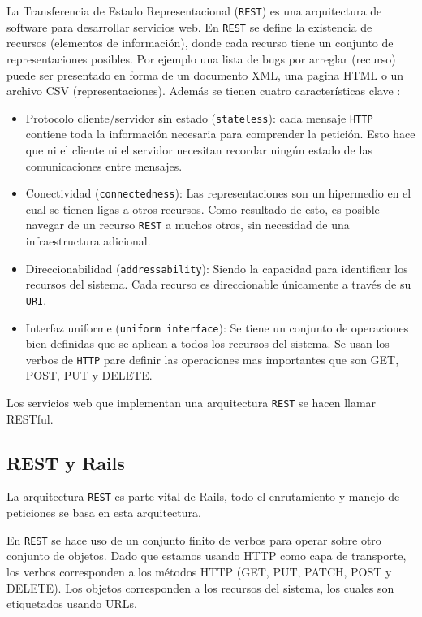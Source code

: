 La Transferencia de Estado Representacional (\texttt{REST}) es una arquitectura
de software para desarrollar servicios web. En \texttt{REST} se define la
existencia de recursos (elementos de información), donde cada recurso tiene un
conjunto de representaciones posibles. Por ejemplo una lista de bugs por arreglar
(recurso) puede ser presentado en forma de un documento XML, una pagina HTML
o un archivo CSV (representaciones). Además se tienen cuatro características
clave \cite[pag.~79]{1_richardson_2007}:

\begin{itemize}
\item Protocolo cliente/servidor sin estado (\texttt{stateless}): cada mensaje
  \texttt{HTTP} contiene toda la información necesaria para comprender la
  petición. Esto hace que ni el cliente ni el servidor necesitan recordar ningún
  estado de las comunicaciones entre mensajes.
\item Conectividad (\texttt{connectedness}): Las representaciones son un hipermedio
  en el cual se tienen ligas a otros recursos. Como resultado de esto, es posible
  navegar de un recurso \texttt{REST} a muchos otros, sin necesidad de una
  infraestructura adicional.
\item Direccionabilidad (\texttt{addressability}): Siendo la capacidad para
  identificar los recursos del sistema. Cada recurso es direccionable únicamente
  a través de su \texttt{URI}.
\item Interfaz uniforme (\texttt{uniform interface}): Se tiene un conjunto de
  operaciones bien definidas que se aplican a todos los recursos del sistema.
  Se usan los verbos de \texttt{HTTP} pare definir las operaciones mas importantes
  que son GET, POST, PUT y DELETE.
\end{itemize}

Los servicios web que implementan una arquitectura \texttt{REST} se hacen llamar
RESTful.

\subsection{REST y Rails}

La arquitectura \texttt{REST} es parte vital de Rails, todo el enrutamiento y
manejo de peticiones se basa en esta arquitectura.

En \texttt{REST} se hace uso de un conjunto finito de verbos para operar sobre otro
conjunto de objetos. Dado que estamos usando HTTP como capa de transporte, los
verbos corresponden a los métodos HTTP (GET, PUT, PATCH, POST y DELETE).
Los objetos corresponden a los recursos del sistema, los cuales son etiquetados
usando URLs.

